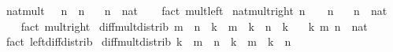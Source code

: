 \begin{isabellebody}
\ nat{\isacharunderscore}{\kern0pt}mult{\isacharunderscore}{\kern0pt}{}{\isacharcolon}{\kern0pt}\ {\isachardoublequoteopen}{}\ {\isacharasterisk}{\kern0pt}\ n\ {\isacharequal}{\kern0pt}\ n{\isachardoublequoteclose}\isanewline
\ \ \ n\ {\isacharcolon}{\kern0pt}{\isacharcolon}{\kern0pt}\ nat\isanewline
%
\isadelimproof
\ \ %
\endisadelimproof
%
\isatagproof
{}\isamarkupfalse%
\ {\isacharparenleft}{\kern0pt}fact\ mult{\isacharunderscore}{\kern0pt}{}{\isacharunderscore}{\kern0pt}left{\isacharparenright}{\kern0pt}%
\endisatagproof
{\isafoldproof}%
%
\isadelimproof
\isanewline
%
\endisadelimproof
\isanewline
{}\isamarkupfalse%
\ nat{\isacharunderscore}{\kern0pt}mult{\isacharunderscore}{\kern0pt}{}{\isacharunderscore}{\kern0pt}right{\isacharcolon}{\kern0pt}\ {\isachardoublequoteopen}n\ {\isacharasterisk}{\kern0pt}\ {}\ {\isacharequal}{\kern0pt}\ n{\isachardoublequoteclose}\isanewline
\ \ \ n\ {\isacharcolon}{\kern0pt}{\isacharcolon}{\kern0pt}\ nat\isanewline
%
\isadelimproof
\ \ %
\endisadelimproof
%
\isatagproof
{}\isamarkupfalse%
\ {\isacharparenleft}{\kern0pt}fact\ mult{\isacharunderscore}{\kern0pt}{}{\isacharunderscore}{\kern0pt}right{\isacharparenright}{\kern0pt}%
\endisatagproof
{\isafoldproof}%
%
\isadelimproof
\isanewline
%
\endisadelimproof
\isanewline
{}\isamarkupfalse%
\ diff{\isacharunderscore}{\kern0pt}mult{\isacharunderscore}{\kern0pt}distrib{\isacharcolon}{\kern0pt}\ {\isachardoublequoteopen}{\isacharparenleft}{\kern0pt}m\ {\isacharminus}{\kern0pt}\ n{\isacharparenright}{\kern0pt}\ {\isacharasterisk}{\kern0pt}\ k\ {\isacharequal}{\kern0pt}\ {\isacharparenleft}{\kern0pt}m\ {\isacharasterisk}{\kern0pt}\ k{\isacharparenright}{\kern0pt}\ {\isacharminus}{\kern0pt}\ {\isacharparenleft}{\kern0pt}n\ {\isacharasterisk}{\kern0pt}\ k{\isacharparenright}{\kern0pt}{\isachardoublequoteclose}\isanewline
\ \ \ k\ m\ n\ {\isacharcolon}{\kern0pt}{\isacharcolon}{\kern0pt}\ nat\isanewline
%
\isadelimproof
\ \ %
\endisadelimproof
%
\isatagproof
{}\isamarkupfalse%
\ {\isacharparenleft}{\kern0pt}fact\ left{\isacharunderscore}{\kern0pt}diff{\isacharunderscore}{\kern0pt}distrib{\isacharprime}{\kern0pt}{\isacharparenright}{\kern0pt}%
\endisatagproof
{\isafoldproof}%
%
\isadelimproof
\isanewline
%
\endisadelimproof
\isanewline
{}\isamarkupfalse%
\ diff{\isacharunderscore}{\kern0pt}mult{\isacharunderscore}{\kern0pt}distrib{}{\isacharcolon}{\kern0pt}\ {\isachardoublequoteopen}k\ {\isacharasterisk}{\kern0pt}\ {\isacharparenleft}{\kern0pt}m\ {\isacharminus}{\kern0pt}\ n{\isacharparenright}{\kern0pt}\ {\isacharequal}{\kern0pt}\ {\isacharparenleft}{\kern0pt}k\ {\isacharasterisk}{\kern0pt}\ m{\isacharparenright}{\kern0pt}\ {\isacharminus}{\kern0pt}\ {\isacharparenleft}{\kern0pt}k\ {\isacharasterisk}{\kern0pt}\ n{\isacharparenright}{\kern0pt}{\isachardoublequoteclose}\isanewline

\end{isabellebody}
